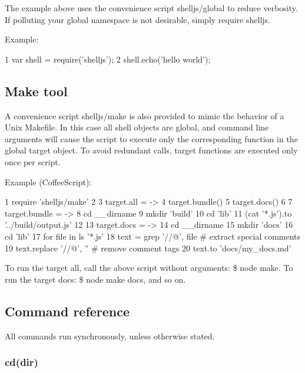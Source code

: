 The example above uses the convenience script {\ttfamily shelljs/global} to reduce verbosity. If polluting your global namespace is not desirable, simply require {\ttfamily shelljs}.

Example\+:


\begin{DoxyCode}
1 var shell = require('shelljs');
2 shell.echo('hello world');
\end{DoxyCode}


\subsection*{Make tool}

A convenience script {\ttfamily shelljs/make} is also provided to mimic the behavior of a Unix Makefile. In this case all shell objects are global, and command line arguments will cause the script to execute only the corresponding function in the global {\ttfamily target} object. To avoid redundant calls, target functions are executed only once per script.

Example (Coffee\+Script)\+:


\begin{DoxyCode}
1 require 'shelljs/make'
2 
3 target.all = ->
4   target.bundle()
5   target.docs()
6 
7 target.bundle = ->
8   cd \_\_dirname
9   mkdir 'build'
10   cd 'lib'
11   (cat '*.js').to '../build/output.js'
12 
13 target.docs = ->
14   cd \_\_dirname
15   mkdir 'docs'
16   cd 'lib'
17   for file in ls '*.js'
18     text = grep '//@', file     # extract special comments
19     text.replace '//@', ''      # remove comment tags
20     text.to 'docs/my\_docs.md'
\end{DoxyCode}


To run the target {\ttfamily all}, call the above script without arguments\+: {\ttfamily \$ node make}. To run the target {\ttfamily docs}\+: {\ttfamily \$ node make docs}, and so on.

\subsection*{Command reference}

All commands run synchronously, unless otherwise stated.

\subsubsection*{cd(\textquotesingle{}dir\textquotesingle{})}

